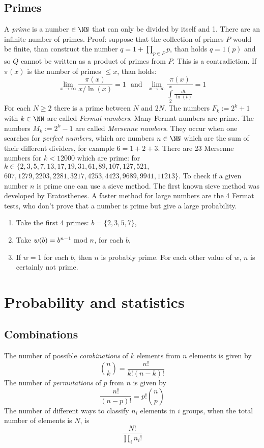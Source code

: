 \section{Primes}
A {\it prime} is a number $\in\NN$ that can only be divided by itself and
1. There are an infinite number of primes. Proof: suppose that the collection of primes
$P$ would be finite, than construct the number $q=1+\prod\limits_{p\in P}p$,
than holds $q=1(p)$ and so $Q$ cannot be written as a product of primes from
$P$. This is a contradiction.
\npar
If $\pi(x)$ is the number of primes $\leq x$, than holds:
\[
\lim_{x\rightarrow\infty}\frac{\pi(x)}{x/\ln(x)}=1~~~\mbox{and}~~~
\lim_{x\rightarrow\infty}\frac{\pi(x)}{\int\limits_2^x\frac{dt}{\ln(t)}}=1
\]
For each $N\geq2$ there is a prime between $N$ and $2N$.
\npar
The numbers $F_k:=2^k+1$ with $k\in\NN$ are called {\it Fermat numbers}.
Many Fermat numbers are prime.
\npar
The numbers $M_k:=2^k-1$ are called {\it Mersenne numbers}. They occur when
one searches for {\it perfect numbers}, which are numbers $n\in\NN$ which are
the sum of their different dividers, for example $6=1+2+3$. There are 23
Mersenne numbers for $k<12000$ which are prime:
for $k\in\{2,3,5,7,13,17,19,31,61,89,107,127,521,$
$607,1279,2203,2281,3217,4253,4423,9689,9941,11213\}$.
\npar
To check if a given number $n$ is prime one can use a sieve method. The
first known sieve method was developed by Eratosthenes. A faster method for
large numbers are the 4 Fermat tests, who don't prove that a number is prime
but give a large probability.
\begin{enumerate}
\item Take the first 4 primes: $b=\{2,3,5,7\}$,
\item Take $w(b)=b^{n-1}~{\rm mod}~n$, for each $b$,
\item If $w=1$ for each $b$, then $n$ is probably prime. For each other value
      of $w$, $n$ is certainly not prime.
\end{enumerate}


\chapter{Probability and statistics}
\section{Combinations}
The number of possible {\it combinations} of $k$ elements from $n$ elements is
given by
\[
{n\choose k}=\frac{n!}{k!(n-k)!}
\]
The number of {\it permutations} of $p$ from $n$ is given by
\[
\frac{n!}{(n-p)!}=p!{n\choose p}
\]
The number of different ways to classify $n_i$ elements in $i$ groups, when
the total number of elements is $N$, is
\[
\frac{N!}{\prod\limits_i n_i!}
\]

